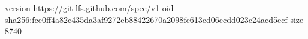 version https://git-lfs.github.com/spec/v1
oid sha256:fce0ff4a82c435da3af9272eb88422670a2098fe613cd06ecdd023c24acd5ecf
size 8740
